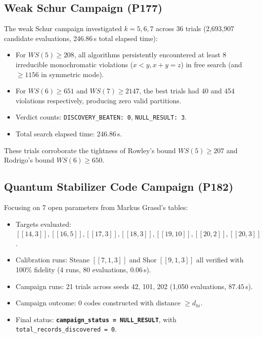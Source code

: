 \documentclass[11pt,a4paper]{article}
\begin{document}
\subsection{Weak Schur Campaign (P177)}
The weak Schur campaign investigated $k=5, 6, 7$ across 36 trials (2,693,907 candidate evaluations, 246.86\,s total elapsed time):
\begin{itemize}
    \item For $WS(5) \ge 208$, all algorithms persistently encountered at least 8 irreducible monochromatic violations ($x < y, x+y=z$) in free search (and $\ge 1156$ in symmetric mode).
    \item For $WS(6) \ge 651$ and $WS(7) \ge 2147$, the best trials had 40 and 454 violations respectively, producing zero valid partitions.
    \item Verdict counts: \texttt{DISCOVERY\_BEATEN: 0}, \texttt{NULL\_RESULT: 3}.
    \item Total search elapsed time: 246.86\,s.
\end{itemize}
These trials corroborate the tightness of Rowley's bound $WS(5) \ge 207$ and Rodrigo's bound $WS(6) \ge 650$.

\subsection{Quantum Stabilizer Code Campaign (P182)}
Focusing on 7 open parameters from Markus Grassl's tables:
\begin{itemize}
    \item Targets evaluated: $[[14,3]], [[16,5]], [[17,3]], [[18,3]], [[19,10]], [[20,2]], [[20,3]]$.
    \item Calibration runs: Steane $[[7,1,3]]$ and Shor $[[9,1,3]]$ all verified with 100\% fidelity (4 runs, 80 evaluations, $0.06$\,s).
    \item Campaign runs: 21 trials across seeds 42, 101, 202 (1,050 evaluations, $87.45$\,s).
    \item Campaign outcome: 0 codes constructed with distance $\ge d_{hi}$.
    \item Final status: \textbf{\texttt{campaign\_status = NULL\_RESULT}}, with \texttt{total\_records\_discovered = 0}.
\end{itemize}
\end{document}

